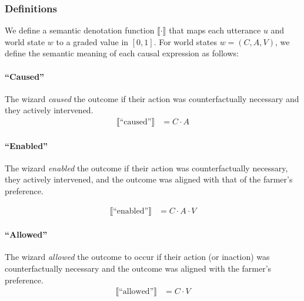 \documentclass[10pt,letterpaper]{article}
\begin{document}
\subsubsection{Definitions}
We define a semantic denotation function $\llbracket \cdot \rrbracket$ that maps each utterance $u$ and world state $w$ to a graded value in $[0, 1]$.
For world states $w = (C, A, V)$, we define the semantic meaning of each causal expression as follows:

\paragraph{``Caused''}
The wizard \emph{caused} the outcome if their action was counterfactually necessary and they actively intervened. 
\begin{align}
    \llbracket \text{``caused''} \rrbracket &= C \cdot A
\end{align}

\paragraph{``Enabled''}
The wizard \emph{enabled} the outcome if their action was counterfactually necessary, they actively intervened, and the outcome was aligned with that of the farmer's preference.

\begin{align}
    \llbracket \text{``enabled''} \rrbracket &= C \cdot A \cdot V
\end{align}


\paragraph{``Allowed''}
The wizard \emph{allowed} the outcome to occur if their action (or inaction) was counterfactually necessary and the outcome was aligned with the farmer's preference.
\begin{align}
    \llbracket \text{``allowed''} \rrbracket &= C \cdot V
\end{align}
\end{document}
